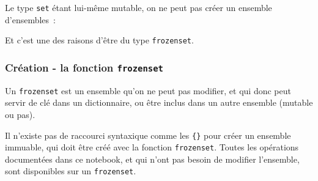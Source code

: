     \begin{Shaded}
\begin{Highlighting}[frame=lines,framerule=0.6mm,rulecolor=\color{asisframecolor}]
\OperatorTok{>>>}\OperatorTok{=}\NormalTok{ \{(}\NormalTok{, }\NormalTok{, [}\NormalTok{, }\NormalTok{])\}}
\NormalTok{, } \OperatorTok{<}\OperatorTok{>}
\NormalTok{: }
\end{Highlighting}
\end{Shaded}

    Le type \texttt{set} étant lui-même mutable, on ne peut pas créer un
ensemble d'ensembles~:

    \begin{Shaded}
\begin{Highlighting}[frame=lines,framerule=0.6mm,rulecolor=\color{asisframecolor}]
\OperatorTok{>>>}\OperatorTok{=}\NormalTok{ \{\{}\NormalTok{, }\NormalTok{\}\}}
\NormalTok{, } \OperatorTok{<}\OperatorTok{>}
\NormalTok{: }
\end{Highlighting}
\end{Shaded}

    Et c'est une des raisons d'être du type \texttt{frozenset}.

    \hypertarget{cruxe9ation---la-fonction-frozenset}{%
\subsubsection{\texorpdfstring{Création - la fonction
\texttt{frozenset}}{Création - la fonction frozenset}}\label{cruxe9ation---la-fonction-frozenset}}

    Un \texttt{frozenset} est un ensemble qu'on ne peut pas modifier, et qui
donc peut servir de clé dans un dictionnaire, ou être inclus dans un
autre ensemble (mutable ou pas).

    Il n'existe pas de raccourci syntaxique comme les \texttt{\{\}} pour
créer un ensemble immuable, qui doit être créé avec la fonction
\texttt{frozenset}. Toutes les opérations documentées dans ce notebook,
et qui n'ont pas besoin de modifier l'ensemble, sont disponibles sur un
\texttt{frozenset}.


